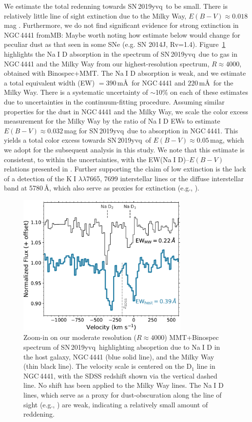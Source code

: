 \documentclass[twocolumn]{aastex63}
\def\ion#1#2{#1$\;${\footnotesize\rm{#2}}\relax}
\newcommand{\frommb}[1]{{\color{purple} fromMB: {#1}}}
\newcommand{\sn}{SN\,2019yvq}
\begin{document}
We estimate the total redenning towards \sn\ to be small. There is relatively
little line of sight extinction due to the Milky Way, $E(B-V) \approx
0.018$\,mag \citep{Schlafly11, Schlegel98}. Furthermore, we do not find
significant evidence for strong extinction in NGC\,4441 \frommb{Maybe worth noting how estimate below would change for peculiar dust as that seen in some SNe (e.g. SN 2014J, Rv=1.4)}. Figure~\ref{fig:NaD}
highlights the \ion{Na}{I} D absorption in the spectrum of \sn\ due to gas in
NGC\,4441 and the Milky Way from our highest-resolution spectrum, $R \approx
4000$, obtained with Binospec+MMT. The \ion{Na}{I} D absorption is weak, and
we estimate a total equivalent width (EW) $= 390$\,m\AA\ for NGC\,4441 and
$220$\,m\AA\ for the Milky Way. There is a systematic uncertainty of
$\sim$10\% on each of these estimates due to uncertainties in the
continuum-fitting procedure. Assuming similar properties for the dust in
NGC\,4441 and the Milky Way, we scale the color excess measurement for the
Milky Way by the ratio of \ion{Na}{I} D EWs to estimate $E(B-V) \approx
0.032$\,mag for \sn\ due to absorption in NGC\,4441. This yields a total
color excess towards \sn\ of $E(B-V) \approx 0.05$\,mag, which we adopt for
the subsequent analysis in this study. We note that this estimate is
consistent, to within the uncertainties, with the EW(\ion{Na}{I} D)--$E(B-V)$
relations presented in \citet{Poznanski12}. Further supporting the claim of
low extinction is the lack of a detection of the \ion{K}{I}
$\lambda\lambda$7665, 7699 interstellar lines or the diffuse interstellar
band at 5780\,\AA, which also serve as proxies for extinction (e.g.,
\citealt{Phillips13}).

\begin{figure}
    \centering
    \includegraphics[width=3.35in]{./figures/NaD.pdf}
    \caption{Zoom-in on our moderate resolution ($R \approx 4000$)
    MMT+Binospec spectrum of \sn\ highlighting absoprtion due to \ion{Na}{I}
    D in the host galaxy, NGC\,4441 (blue solid line), and the Milky Way
    (thin black line). The velocity scale is centered on the D$_1$ line in
    NGC\,4441, with the SDSS redshift shown via the vertical dashed line. No
    shift has been applied to the Milky Way lines. The \ion{Na}{I} D lines,
    which serve as a proxy for dust-obscuration along the line of sight
    (e.g., \citealt{Poznanski12,Phillips13}) are weak, indicating a
    relatively small amount of reddening.}
    \label{fig:NaD}
\end{figure}
\end{document}
